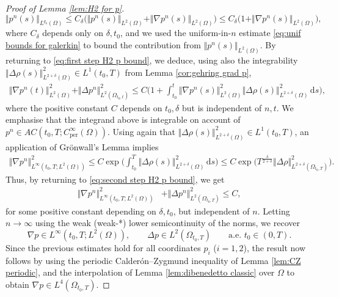 \documentclass[11pt,a4paper,reqno]{amsart}
\theoremstyle{remark}
\theoremstyle{definition}
\numberwithin{equation}{section}
\newcommand{\per}{\mathrm{per}}
\renewcommand{\d}{\, \mathrm{d} }
\begin{document}
\begin{proof}[Proof of Lemma \ref{lem:H2 for p}]
\begin{equation*}
    \Vert p^n(s) \Vert_{L^{q_\delta}(\Omega)} \leq C_\delta \Big( \Vert p^n(s) \Vert_{L^2(\Omega)} + \Vert \nabla p^n(s) \Vert_{L^2(\Omega)} \Big) \leq C_\delta \Big( 1 + \Vert \nabla p^n(s) \Vert_{L^2(\Omega)} \Big), 
\end{equation*}
where $C_\delta$ depends only on $\delta,t_0$, and we used the uniform-in-$n$ estimate \eqref{eq:unif bounds for galerkin} to bound the contribution from $\Vert p^n(s) \Vert_{L^2(\Omega)}$. By returning to \eqref{eq:first step H2 p bound}, we deduce, using also the integrability $\Vert \Delta \rho(s) \Vert^2_{L^{2+\delta}(\Omega)} \in L^1(t_0,T)$ from Lemma \ref{cor:gehring grad p}, 
\begin{equation}\label{eq:second step H2 p bound}
    \begin{aligned}
       \Vert \nabla p^n(t)\Vert_{L^2(\Omega)}^2 + \Vert \Delta p^n \Vert_{L^2(\Omega_{t_0,t})}^2 \leq  C\bigg( 1 + \int_{t_0}^t\Vert \nabla p^n(s) \Vert_{L^{2}(\Omega)}^2 \Vert \Delta \rho(s) \Vert_{L^{2+\delta}(\Omega)}^{2} \d s \bigg), 
    \end{aligned}
\end{equation}
where the positive constant $C$ depends on $t_0,\delta$ but is independent of $n,t$. We emphasise that the integrand above is integrable on account of $p^n \in AC(t_0,T;C^\infty_{\per}(\Omega))$. Using again that $\Vert \Delta \rho(s) \Vert^2_{L^{2+\delta}(\Omega)} \in L^1(t_0,T)$, an application of Gr\"onwall's Lemma implies 
\begin{equation*}
    \begin{aligned}
       \Vert \nabla p^n\Vert_{L^\infty(t_0,T;L^2(\Omega))}^2 \leq  C \exp \bigg( \int_{t_0}^T \Vert \Delta \rho(s) \Vert_{L^{2+\delta}(\Omega)}^{2} \d s \bigg) \leq C \exp \Big({T^{\frac{\delta}{2+\delta}}\Vert \Delta \rho \Vert^2_{L^{2+\delta}(\Omega_{t_0,T})}} \Big). 
    \end{aligned}
\end{equation*}
Thus, by returning to \eqref{eq:second step H2 p bound}, we get 
\begin{equation*}
    \begin{aligned}
       \Vert \nabla p^n\Vert_{L^\infty(t_0,T;L^2(\Omega))}^2 & + \Vert \Delta p^n\Vert_{L^2(\Omega_{t_0,T})}^2 \leq C, 
    \end{aligned}
\end{equation*}
for some positive constant depending on $\delta,t_0$, but independent of $n$. Letting $n\to\infty$ using the weak (weak-*) lower semicontinuity of the norms, we recover 
\begin{equation*}
    \nabla p \in L^\infty(t_0,T;L^2(\Omega)), \qquad \Delta p \in L^2(\Omega_{t_0,T}) \qquad \text{a.e.~}t_0 \in (0,T). 
\end{equation*}
Since the previous estimates hold for all coordinates $p_i$ ($i=1,2$), the result now follows by using the periodic Calder\'on--Zygmund inequality of Lemma \ref{lem:CZ periodic}, and the interpolation  of Lemma \ref{lem:dibenedetto classic} over $\Omega$ to obtain $\nabla p \in L^4(\Omega_{t_0,T})$. 


\end{proof}
\end{document}

